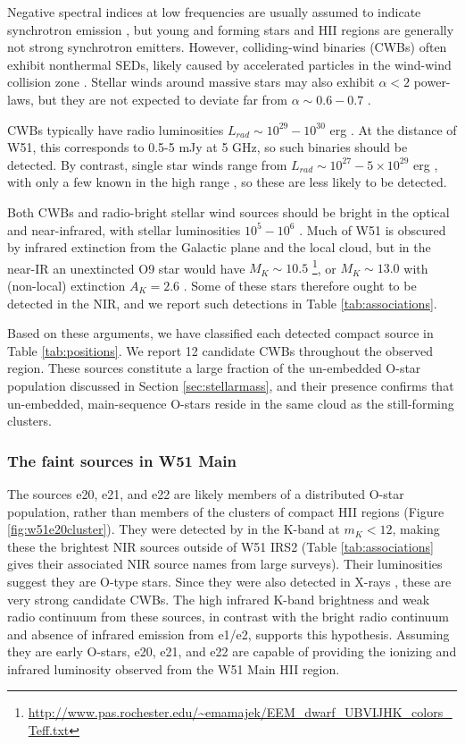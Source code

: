 Negative spectral indices at low frequencies are usually assumed to indicate
synchrotron emission \citep{Wilson2009a,Condon2007a}, but young and forming
stars and HII regions are generally not strong synchrotron emitters.  However,
colliding-wind binaries (CWBs) often exhibit nonthermal SEDs, likely caused by
accelerated particles in the wind-wind collision zone \citep{De-Becker2013a}.
Stellar winds around massive stars may also exhibit $\alpha<2$ power-laws, but
they are not expected to deviate far from $\alpha\sim0.6-0.7$
\citep{Wright1975a,Panagia1975b,Reynolds1986a}.

CWBs typically have radio luminosities
$L_{rad}\sim10^{29}-10^{30}$ erg \pers \citep{De-Becker2013a}.   At the
distance of W51, this corresponds to 0.5-5 mJy at 5 GHz, so such binaries
should be detected.  By contrast, single star winds range from $L_{rad} \sim
10^{27}-5\times10^{29}$ erg \pers, with only a few known in the high range
\citep{Bieging1989a}, so these are less likely to be detected.

Both CWBs and radio-bright stellar wind sources should be bright in the
optical and near-infrared, with stellar luminosities $10^5-10^6$ \lsun.
Much of W51 is obscured by infrared extinction from the Galactic plane
and the local cloud, but in the near-IR an unextincted O9 star would have
$M_K\sim10.5$
\citep{Pecaut2013a}\footnote{\url{http://www.pas.rochester.edu/~emamajek/EEM_dwarf_UBVIJHK_colors_Teff.txt}},
or $M_K\sim 13.0$ with (non-local) extinction $A_K=2.6$ \citep{Goldader1994a}.
Some of these stars therefore ought to be detected in the NIR, and we
report such detections in Table \ref{tab:associations}.

Based on these arguments, we have classified each detected compact source in
Table \ref{tab:positions}.  We report 12 candidate CWBs throughout the observed
region.  These sources constitute a large fraction of the un-embedded O-star
population discussed in Section \ref{sec:stellarmass}, and their presence confirms
that un-embedded, main-sequence O-stars reside in the same cloud as the still-forming
clusters.

\subsubsection{The faint sources in W51 Main}

The sources e20, e21, and e22 are likely members of a distributed O-star
population, rather than members of the clusters of compact HII regions (Figure
\ref{fig:w51e20cluster}).  They were detected by \citet{Goldader1994a} in the
K-band at $m_K < 12$, making these the brightest NIR sources outside of W51
IRS2 (Table \ref{tab:associations} gives their associated NIR source names
from large surveys).  Their luminosities suggest they are O-type stars.  Since
they were also detected in X-rays \citep{Townsley2014a}, these are very strong
candidate CWBs.  The high infrared K-band brightness and weak radio
continuum from these sources, in contrast with the bright radio continuum and
absence of infrared emission from e1/e2, supports this hypothesis.  
Assuming they are early O-stars, e20, e21, and e22 are capable of providing the
ionizing and infrared luminosity observed from the W51 Main HII region.

